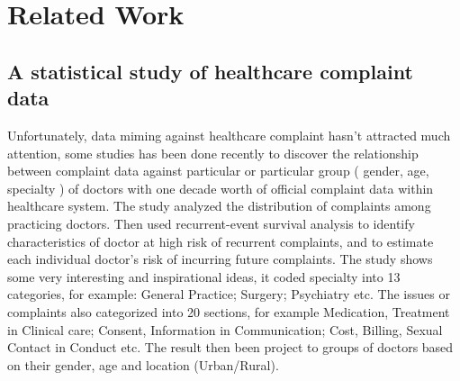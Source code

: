\documentclass[a4paper,11pt]{article}
\begin{document}
\section{Related Work}
\subsection{A statistical study of healthcare complaint data}\cite{ref5}
Unfortunately, data miming against healthcare complaint hasn’t attracted much attention,  some studies has been done recently to discover the relationship between complaint data against particular or particular group ( gender, age, specialty ) of doctors with one decade worth of official complaint data within healthcare system. The study analyzed the distribution of complaints among practicing doctors. Then used recurrent-event survival analysis to identify characteristics of doctor at high risk of recurrent complaints, and to estimate each individual doctor’s risk of incurring future complaints. The study shows some very interesting and inspirational ideas, it coded specialty into 13 categories, for example: General Practice; Surgery; Psychiatry etc. The issues or complaints also categorized into 20 sections, for example Medication, Treatment in Clinical care; Consent, Information in Communication; Cost, Billing, Sexual Contact in Conduct etc. The result then been project to groups of doctors based on their gender, age and location (Urban/Rural). 
\end{document}
